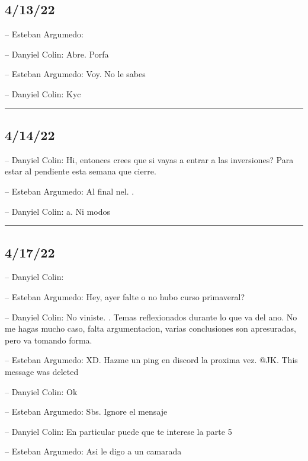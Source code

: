 \hypertarget{section-53}{%
\subsection{4/13/22}\label{section-53}}

-- Esteban Argumedo:

-- Danyiel Colin: Abre. Porfa

-- Esteban Argumedo: Voy. No le sabes

-- Danyiel Colin: Kyc

\begin{center}\rule{0.5\linewidth}{0.5pt}\end{center}

\hypertarget{section-54}{%
\subsection{4/14/22}\label{section-54}}

-- Danyiel Colin: Hi, entonces crees que si vayas a entrar a las
inversiones? Para estar al pendiente esta semana que cierre.

-- Esteban Argumedo: Al final nel. .

-- Danyiel Colin: a. Ni modos

\begin{center}\rule{0.5\linewidth}{0.5pt}\end{center}

\hypertarget{section-55}{%
\subsection{4/17/22}\label{section-55}}

-- Danyiel Colin:

-- Esteban Argumedo: Hey, ayer falte o no hubo curso primaveral?

-- Danyiel Colin: No viniste. . Temas reflexionados durante lo que va
del ano. No me hagas mucho caso, falta argumentacion, varias
conclusiones son apresuradas, pero va tomando forma.

-- Esteban Argumedo: XD. Hazme un ping en discord la proxima vez. @JK.
This message was deleted

-- Danyiel Colin: Ok

-- Esteban Argumedo: Sbs. Ignore el mensaje

-- Danyiel Colin: En particular puede que te interese la parte 5

-- Esteban Argumedo: Asi le digo a un camarada


